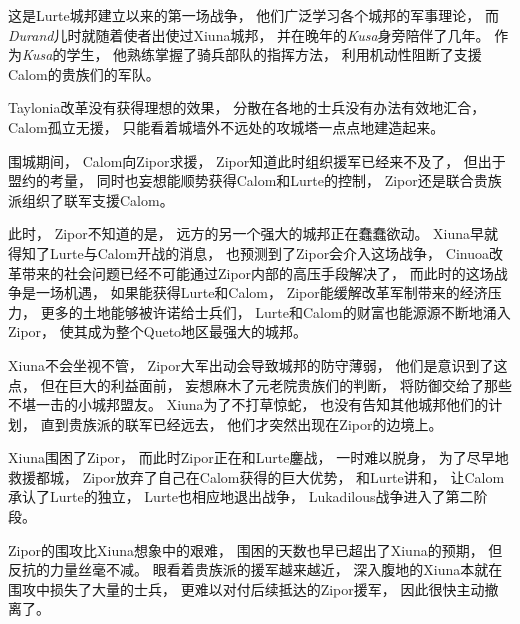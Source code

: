\documentclass[UTF8,12pt,draft]{ctexbook}
\begin{document}
                这是Lurte城邦建立以来的第一场战争，
                他们广泛学习各个城邦的军事理论，
                而\emph{Durand}儿时就随着使者出使过Xiuna城邦，
                并在晚年的\emph{Kusa}身旁陪伴了几年。
                作为\emph{Kusa}的学生，
                他熟练掌握了骑兵部队的指挥方法，
                利用机动性阻断了支援Calom的贵族们的军队。

                Taylonia改革没有获得理想的效果，
                分散在各地的士兵没有办法有效地汇合，
                Calom孤立无援，
                只能看着城墙外不远处的攻城塔一点点地建造起来。

                围城期间，
                Calom向Zipor求援，
                Zipor知道此时组织援军已经来不及了，
                但出于盟约的考量，
                同时也妄想能顺势获得Calom和Lurte的控制，
                Zipor还是联合贵族派组织了联军支援Calom。

                此时，
                Zipor不知道的是，
                远方的另一个强大的城邦正在蠢蠢欲动。
                Xiuna早就得知了Lurte与Calom开战的消息，
                也预测到了Zipor会介入这场战争，
                Cinuoa改革带来的社会问题已经不可能通过Zipor内部的高压手段解决了，
                而此时的这场战争是一场机遇，
                如果能获得Lurte和Calom，
                Zipor能缓解改革军制带来的经济压力，
                更多的土地能够被许诺给士兵们，
                Lurte和Calom的财富也能源源不断地涌入Zipor，
                使其成为整个Queto地区最强大的城邦。

                Xiuna不会坐视不管，
                Zipor大军出动会导致城邦的防守薄弱，
                他们是意识到了这点，
                但在巨大的利益面前，
                妄想麻木了元老院贵族们的判断，
                将防御交给了那些不堪一击的小城邦盟友。
                Xiuna为了不打草惊蛇，
                也没有告知其他城邦他们的计划，
                直到贵族派的联军已经远去，
                他们才突然出现在Zipor的边境上。
                
                Xiuna围困了Zipor，
                而此时Zipor正在和Lurte鏖战，
                一时难以脱身，
                为了尽早地救援都城，
                Zipor放弃了自己在Calom获得的巨大优势，
                和Lurte讲和，
                让Calom承认了Lurte的独立，
                Lurte也相应地退出战争，
                Lukadilous战争进入了第二阶段。

                Zipor的围攻比Xiuna想象中的艰难，
                围困的天数也早已超出了Xiuna的预期，
                但反抗的力量丝毫不减。
                眼看着贵族派的援军越来越近，
                深入腹地的Xiuna本就在围攻中损失了大量的士兵，
                更难以对付后续抵达的Zipor援军，
                因此很快主动撤离了。
\end{document}
